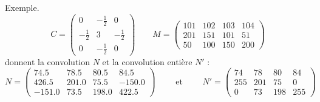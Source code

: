 \documentclass[11pt,class=report,crop=false]{standalone}
\begin{document}
\begin{activite}
\begin{enumerate}
	Exemple.
	$$
	C = \begin{pmatrix}0&-\frac12&0\\-\frac12&3&-\frac12\\0&-\frac12&0\end{pmatrix}\qquad
	M = \begin{pmatrix}
	101&102&103&104\\
	201&151&101&51\\
	50&100&150&200
	\end{pmatrix}$$
	donnent la convolution $N$ et la convolution entière $N'$ :
	$$N = \begin{pmatrix}
	74.5&78.5&80.5&84.5\\ 
	426.5&201.0&75.5&-150.0\\
	-151.0&73.5&198.0&422.5
	\end{pmatrix}
	\qquad \text{ et } \qquad 
	N'= \begin{pmatrix}
		74&78&80&84\\ 
		255&201&75&0\\
		0&73&198&255
	\end{pmatrix}$$
	
\end{enumerate}
		
\end{activite}


\end{document}
